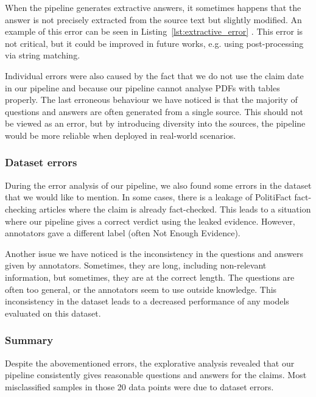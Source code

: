 When the pipeline generates extractive answers, it sometimes happens that the answer is not precisely extracted from the source text but slightly modified. An example of this error can be seen in Listing~\ref{lst:extractive_error} . This error is not critical, but it could be improved in future works, e.g. using post-processing via string matching.

Individual errors were also caused by the fact that we do not use the claim date in our pipeline and because our pipeline cannot analyse PDFs with tables properly. The last erroneous behaviour we have noticed is that the majority of questions and answers are often generated from a single source. This should not be viewed as an error, but by introducing diversity into the sources, the pipeline would be more reliable when deployed in real-world scenarios.

\subsubsection{Dataset errors}
During the error analysis of our pipeline, we also found some errors in the \averitec{} dataset that we would like to mention. In some cases, there is a leakage of PolitiFact fact-checking articles where the claim is already fact-checked. This leads to a situation where our pipeline gives a correct verdict using the leaked evidence. However, annotators gave a different label (often Not Enough Evidence). 

Another issue we have noticed is the inconsistency in the questions and answers given by annotators. Sometimes, they are long, including non-relevant information, but sometimes, they are at the correct length. The questions are often too general, or the annotators seem to use outside knowledge. This inconsistency in the dataset leads to a decreased performance of any models evaluated on this dataset.

\subsubsection{Summary}
Despite the abovementioned errors, the explorative analysis revealed that our pipeline consistently gives reasonable questions and answers for the claims. Most misclassified samples in those 20 data points were due to dataset errors.

